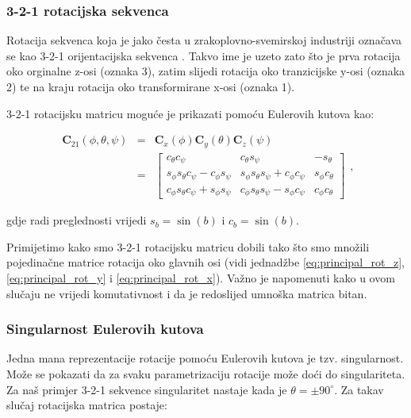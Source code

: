 \documentclass[times, utf8, diplomski, numeric]{templates/template}
\begin{document}
{{{            \subsubsection{3-2-1 rotacijska sekvenca}{
                Rotacija sekvenca koja je jako česta u zrakoplovno-svemirskoj industriji označava se kao 3-2-1 orijentacijska sekvenca . Takvo ime je uzeto zato što je prva rotacija oko orginalne z-osi (oznaka 3), zatim slijedi rotacija oko tranzicijske y-osi (oznaka 2) te na kraju rotacija oko transformirane x-osi (oznaka 1).

                3-2-1 rotacijsku matricu moguće je prikazati pomoću Eulerovih kutova kao:

                \begin{equation}
                \label{eq:euler_rot_mat}
                \begin{array}{rcl}
                \boldsymbol{C}_{21}(\phi, \theta, \psi) & = & \boldsymbol{C}_{x}(\phi) \boldsymbol{C}_{y}(\theta) \boldsymbol{C}_{z}(\psi) \\
                & = &
                \begin{bmatrix}
                    c_{\theta}c_{\psi}                            & c_{\theta}s_{\psi}                            & -s_{\theta} \\
                    s_{\phi}s_{\theta}c_{\psi} - c_{\phi}s_{\psi} & s_{\phi}s_{\theta}s_{\psi} + c_{\phi}c_{\psi} & s_{\phi}c_{\theta} \\
                    c_{\phi}s_{\theta}c_{\psi} + s_{\phi}s_{\psi} & c_{\phi}s_{\theta}s_{\psi} - s_{\phi}c_{\psi} & c_{\phi}c_{\theta}
                \end{bmatrix}
                \end{array}
                ,
                \end{equation}

                gdje radi preglednosti vrijedi $s_{b}=\sin(b)$ i $c_{b}=\sin(b)$.

                Primijetimo kako smo 3-2-1 rotacijsku matricu dobili tako što smo množili pojedinačne matrice rotacija oko glavnih osi (vidi jednadžbe \ref{eq:principal_rot_z}, \ref{eq:principal_rot_y} i \ref{eq:principal_rot_x}). Važno je napomenuti kako u ovom slučaju ne vrijedi komutativnost i da je redoslijed umnoška matrica bitan.
            }

            \subsubsection{Singularnost Eulerovih kutova}{
            \label{subsubsection:singularnost_eulerovih_kutova}
                Jedna mana reprezentacije rotacije pomoću Eulerovih kutova je tzv. singularnost. Može se pokazati da za svaku parametrizaciju rotacije može doći do singulariteta. Za naš primjer 3-2-1 sekvence singularitet nastaje kada je $\theta=\pm90^{\circ}$. Za takav slučaj rotacijska matrica postaje:

}}}}
\end{document}
